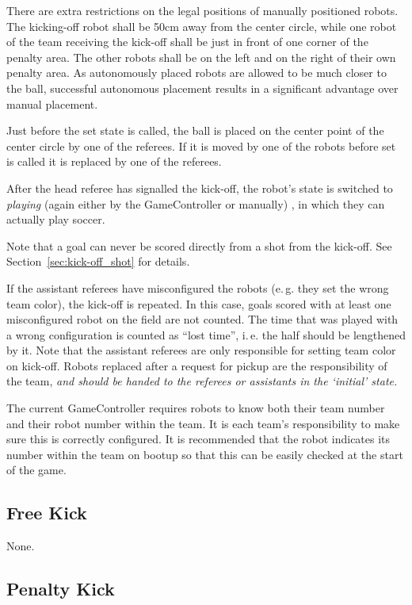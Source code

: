 \documentclass[12pt]{article}
\newcommand{\ie}{\mbox{i.\,e.}\xspace}
\newcommand{\eg}{\mbox{e.\,g.}\xspace}
\begin{document}
There are extra restrictions on the legal positions of manually
positioned robots. The kicking-off robot shall be 50cm
away from the center circle, while one robot of the team receiving the kick-off shall
be just in front of one corner of the penalty area. The other robots
shall be on the left and on the right of their own penalty area. As
autonomously placed robots are allowed to be much closer to the
ball, successful autonomous placement results in a significant
advantage over manual placement.

Just before the set state is called, the ball is placed on the
center point of the center circle by one of the referees.  If it
is moved by one of the robots before set is called it is replaced
by one of the referees.

After the head referee has signalled the kick-off, the robot's state
is switched to \emph{playing} (again either by the GameController or manually)
, in which they can actually play soccer.

Note that a goal can never be scored directly from a shot from the
kick-off. See Section~\ref{sec:kick-off_shot} for details.

If the assistant referees have misconfigured the robots (\eg they
set the wrong team color), the kick-off is repeated. In this case,
goals scored with at least one misconfigured robot on the field are
not counted. The time that was played with a wrong configuration is
counted as ``lost time'', \ie the half should be lengthened by it.
Note that the assistant referees are only responsible for setting team
color on kick-off.  Robots replaced after a request for pickup are
the responsibility of the team, %
\emph{and should be handed to the referees or assistants in the `initial' state.}

The current GameController requires robots to know both their team number
and their robot number within the team.  It is each team's responsibility
to make sure this is correctly configured.  It is recommended that the
robot indicates its number within the team on bootup so that this can
be easily checked at the start of the game. %

\subsection{Free Kick}
None.

\subsection{Penalty Kick}
\label{sec:penalty_kick}
\end{document}
